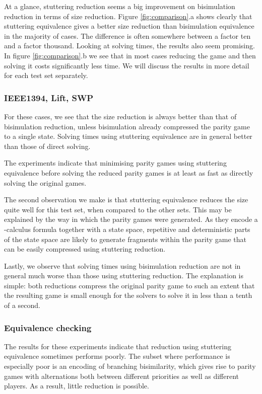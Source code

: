 \documentclass[a4paper]{llncs}
\begin{document}
At a glance, stuttering reduction seems a big improvement on bisimulation 
reduction in terms of size reduction. Figure \ref{fig:comparison}.a shows 
clearly that stuttering equivalence gives a better size reduction than 
bisimulation equivalence in the majority of cases. The difference is often 
somewhere between a factor ten and a factor thousand. Looking at solving times, 
the results also seem promising. In figure \ref{fig:comparison}.b we see that 
in most cases reducing the game and then solving it costs significantly less 
time. We will discuss the results in more detail for each test set separately.

\subsubsection{IEEE1394, Lift, SWP}

For these cases, we see that the size reduction is always better than that of
bisimulation reduction, unless bisimulation already compressed the parity game
to a single state. Solving times using stuttering equivalence are in general 
better than those of direct solving.

The experiments indicate
that minimising parity games using stuttering equivalence before solving
the reduced parity games is at least as fast as directly solving the
original games.

The second observation we make is that stuttering equivalence reduces the size
quite well for this test set, when compared to the other sets. This may be 
explained by the way in which the parity games were generated. As they encode
a -calculus formula together with a state space, repetitive and 
deterministic parts of the state space are likely to generate fragments within
the parity game that can be easily compressed using stuttering reduction.

Lastly, we observe that solving times using bisimulation reduction are not
in general much worse than those using stuttering reduction. The explanation is
simple: both reductions compress the original parity game to such an extent that
the resulting game is small enough for the solvers to solve it in less than a 
tenth of a second.

\subsubsection{Equivalence checking}

The results for these experiments indicate that reduction using stuttering
equivalence sometimes performs poorly. The subset where performance is
especially poor is an encoding of branching bisimilarity, which gives rise to
parity games with alternations both between different priorities as well as
different players. As a result, little reduction is possible.
\end{document}
